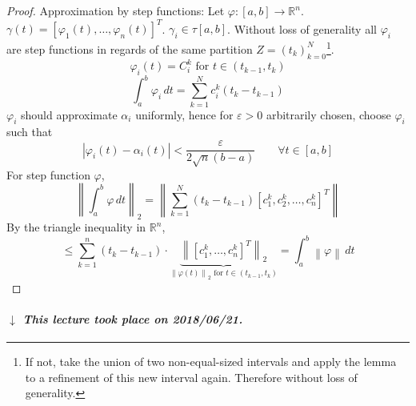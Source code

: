 \documentclass{article}
\newcommand{\norm}[1]{\left\|#1\right\|}
\newcommand{\card}[1]{\left|#1\right|}
\newcommand{\dateref}[1]{%
  \begin{mdframed}[backgroundcolor=gray!10,innerbottommargin=0pt,innertopmargin=0pt]
    \paragraph{\textit{$\downarrow$ This lecture took place on #1.}}%
  \end{mdframed}%
}
\begin{document}
\begin{proof}
  Approximation by step functions: Let $\varphi: [a,b] \to \mathbb R^n$.
  $\gamma(t) = \left[\varphi_1(t), \dots, \varphi_n(t)\right]^T$.
  $\gamma_i \in \tau[a,b]$. Without loss of generality all $\varphi_i$ are step functions in regards of the same partition $Z = (t_k)_{k=0}^N$\footnote{If not, take the union of two non-equal-sized intervals and apply the lemma to a refinement of this new interval again. Therefore without loss of generality.}.
  \[ \varphi_i(t) = C_i^k \text{ for } t \in (t_{k-1}, t_k) \]
  \[ \int_a^b \varphi_i \, dt = \sum_{k=1}^N c_i^k (t_k - t_{k-1}) \]
  $\varphi_i$ should approximate $\alpha_i$ uniformly, hence for $\varepsilon > 0$ arbitrarily chosen, choose $\varphi_i$ such that
  \[ \card{\varphi_i(t) - \alpha_i(t)} < \frac{\varepsilon}{2 \sqrt n (b - a)} \qquad \forall t \in [a,b] \]
  For step function $\varphi$,
  \[ \norm{\int_a^b \varphi \, dt}_2 = \norm{\sum_{k=1}^N (t_k - t_{k-1}) \left[c_1^k, c_2^k, \dots, c_n^k\right]^T} \]
  By the triangle inequality in $\mathbb R^n$,
  \[ \leq \sum_{k=1}^n (t_k - t_{k-1}) \cdot \underbrace{\norm{\left[c_1^k, \dots, c_n^k\right]^T}_2}_{\norm{\varphi(t)}_2 \text{ for } t \in (t_{k-1}, t_k)} = \int_a^b \norm{\varphi} \, dt \]
\end{proof}

\dateref{2018/06/21}
\end{document}

